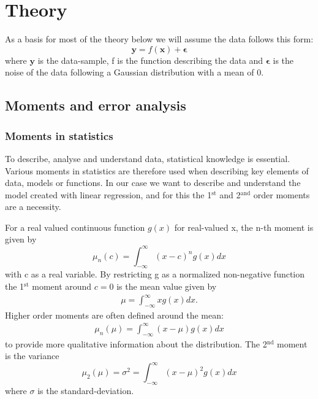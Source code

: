 \documentclass[uio,jmp,amsmath,amssymb,reprint,nofootinbib]{revtex4-1}
\numberwithin{equation}{section}
\newcommand{\infint}{\int_{-\infty}^\infty}
\begin{document}


\section{Theory}\label{sec:Theory}

As a basis for most of the theory below we will assume the data follows this form:
\begin{equation}\label{eq:01}
    \bm{y} = f(\bm{x}) + \bm{\epsilon}
\end{equation}
where \(\bm{y}\) is the data-sample, f is the function describing the data and \(\bm{\epsilon}\) is the noise of the data following a Gaussian distribution with a mean of 0.

\subsection{Moments and error analysis}

\subsubsection{Moments in statistics}

To describe, analyse and understand data, statistical knowledge is essential. Various moments in statistics are therefore used when describing key elements of data, models or functions. In our case we want to describe and understand the model created with linear regression, and for this the 1\(^\text{st}\) and 2\(^\text{and}\) order moments are a necessity.

For a real valued continuous function \(g(x)\) for real-valued x, the n-th moment is given by
\begin{equation}
    \mu_n(c) = \infint (x-c)^ng(x)dx
\end{equation}
with c as a real variable. By restricting g as a normalized non-negative function the 1\(^\text{st}\) moment around \(c=0\) is the mean value given by
\begin{align}
    \mu = \infint xg(x)dx.
\end{align}
Higher order moments are often defined around the mean:
\begin{align}
    \mu_n(\mu) = \infint (x-\mu)g(x)dx
\end{align}
to provide more qualitative information about the distribution. The 2\(^\text{nd}\) moment is the variance
\begin{equation}
    \mu_2(\mu) = \sigma^2 = \infint (x-\mu)^2g(x)dx
\end{equation}
where \(\sigma\) is the standard-deviation.
\end{document}
